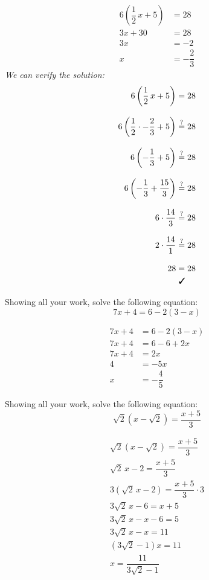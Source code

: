 \documentclass[12pt,letterpaper]{exam}
\begin{document}
\begin{questions}
{\itshape
	\[
	\begin{aligned}
	6 \left( \dfrac{1}{2}\,x + 5 \right)&= 28 \\[0.3cm]
	3x + 30&= 28 \\[0.3cm]
	3x&= -2 \\[0.3cm]
	x&= -\dfrac{2}{3}
	\end{aligned}
	\] \pspace
We can verify the solution: \pspace
	\[
	\begin{aligned}
	6 \left( \dfrac{1}{2}\,x + 5 \right)&= 28 \\[0.3cm]
	6 \left(\dfrac{1}{2} \cdot -\dfrac{2}{3} + 5 \right) &\stackrel{?}{=} 28 \\[0.3cm]
	6 \left(-\dfrac{1}{3} + 5 \right) &\stackrel{?}{=} 28 \\[0.3cm]
	6 \left(-\dfrac{1}{3} + \dfrac{15}{3} \right) &\stackrel{?}{=} 28 \\[0.3cm]
	6 \cdot \dfrac{14}{3} &\stackrel{?}{=} 28 \\[0.3cm]
	2 \cdot \dfrac{14}{1} &\stackrel{?}{=} 28 \\[0.3cm]
	28&= 28 \\
	&\text{ \cmark}
	\end{aligned}
	\]
}



\newpage
\question[10] Showing all your work, solve the following equation:
	\[
	7x + 4= 6 - 2(3 - x)
	\] \pvspace{1.5cm}

	\[
	\begin{aligned}
	7x + 4&= 6 - 2(3 - x) \\[0.3cm]
	7x + 4&= 6 - 6 + 2x \\[0.3cm]
	7x + 4&= 2x \\[0.3cm]
	4&= -5x \\[0.3cm]
	x&= -\dfrac{4}{5}
	\end{aligned}
	\]



\newpage
\question[10] Showing all your work, solve the following equation:
	\[
	\sqrt{2} \left( x - \sqrt{2} \right)= \dfrac{x + 5}{3}
	\] \pvspace{1.5cm}

	\[
	\begin{aligned}
	\sqrt{2} \left( x - \sqrt{2} \right)= \dfrac{x + 5}{3} \\[0.3cm]
	\sqrt{2}\,x - 2= \dfrac{x + 5}{3} \\[0.3cm]
	3(\sqrt{2}\,x - 2)= \dfrac{x + 5}{3} \cdot 3 \\[0.3cm]
	3\sqrt{2}\,x - 6= x + 5 \\[0.3cm]
	3\sqrt{2}\,x - x - 6= 5 \\[0.3cm]
	3\sqrt{2}\,x - x= 11 \\[0.3cm]
	(3\sqrt{2} - 1)x= 11 \\[0.3cm]
	x= \dfrac{11}{3\sqrt{2} - 1}
	\end{aligned}
	\]




\end{questions}
\end{document}
